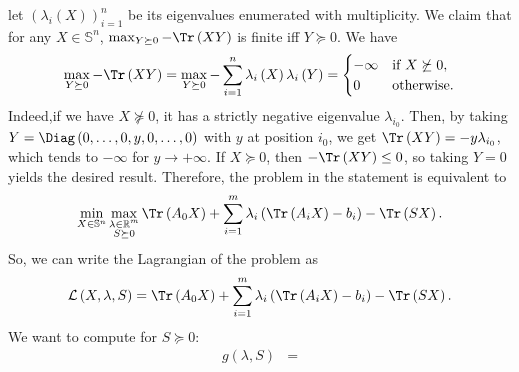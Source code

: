 \documentclass{article}
\begin{document}
\begin{itemize}
           let $\left(\lambda_{i}\left(X\right)\right)_{i = 1}^{n}$ 
           be its eigenvalues enumerated
           with multiplicity.
           We claim that for any $X \in \mathbb{S}^{n}$,
           $\max_{Y \succeq 0} - \Tr\left(XY\right)$ 
           is finite iff $Y \succeq 0$.
           We have
           \begin{equation*}
               \max_{Y \succeq 0} - \Tr\left(XY\right) =
               \max_{Y \succeq 0} - \sum_{i = 1}^{n}
               \lambda_{i}\left(X\right) \lambda_{i}\left(Y\right) = 
               \begin{cases}
                   - \infty &\text{if } X \not \succeq 0, \\
                   0 &\text{otherwise}.
               \end{cases}
           \end{equation*}
           Indeed,if we have
           $X \not\succeq 0$, it has
           a strictly negative eigenvalue $\lambda_{i_{0}}$.
           Then, by taking $Y = \Diag\left(0, \ldots, 0, y, 0, \ldots, 0\right)$
           with $y$ at position $i_0$, we get
           $\Tr\left(XY\right) = -y \lambda_{i_0}$,
           which tends to $- \infty$
           for $y \rightarrow +\infty$.
           If $X \succeq 0$, then $-\Tr\left(XY\right) \leq 0$,
           so taking $Y = 0$ yields the 
           desired result.
           Therefore, the problem in the statement is
           equivalent to
           \begin{equation*}
               \min_{X \in \mathbb{S}^{n}}
               \max_{\substack{
               \lambda \in \mathbb{R}^{m} \\
               S \succeq 0
               }}
               \Tr\left(A_0X\right) +
               \sum_{i = 1}^{m}
               \lambda_{i}\left(\Tr\left(A_{i}X\right) - b_{i}\right)
               - \Tr\left(SX\right).
           \end{equation*}
           So, we can write the Lagrangian of the
           problem as
           \begin{equation*}
               \mathcal{L}\left(X, \lambda, S \right) = 
               \Tr\left(A_0X\right) +
               \sum_{i = 1}^{m} \lambda_{i}
               \left(\Tr\left(A_{i}X\right) - b_{i}\right) - 
               \Tr\left(SX\right).
           \end{equation*}
           We want to compute for $S \succeq 0$:
           \begin{align*}
               g\left(\lambda, S\right) &=

\end{align*}
\end{itemize}
\end{document}

